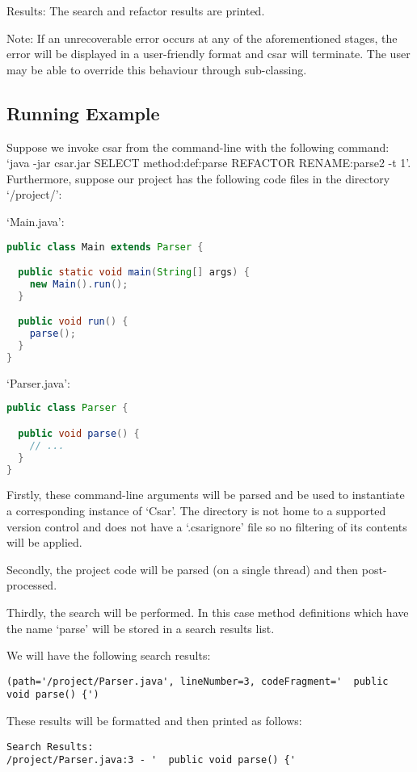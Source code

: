 \documentclass[12pt, letterpaper, oneside]{article}
\begin{document}
Results:\newline
The search and refactor results are printed.

Note: If an unrecoverable error occurs at any of the aforementioned stages, the error will be displayed in a user-friendly format and csar will terminate.
The user may be able to override this behaviour through sub-classing.

\subsection{Running Example}
Suppose we invoke csar from the command-line with the following command: `java -jar csar.jar SELECT method:def:parse REFACTOR RENAME:parse2 -t 1'.
Furthermore, suppose our project has the following code files in the directory `/project/':

`Main.java':
\begin{lstlisting}[language=Java]
public class Main extends Parser {

  public static void main(String[] args) {
    new Main().run();
  }

  public void run() {
    parse();
  }
}
\end{lstlisting}

`Parser.java':
\begin{lstlisting}[language=Java]
public class Parser {

  public void parse() {
    // ...
  }
}
\end{lstlisting}

Firstly, these command-line arguments will be parsed and be used to instantiate a corresponding instance of `Csar'. The directory is not home to a supported version control and does not have a `.csarignore' file so no filtering of its contents will be applied.

Secondly, the project code will be parsed (on a single thread) and then post-processed.

Thirdly, the search will be performed. In this case method definitions which have the name `parse' will be stored in a search results list.

We will have the following search results:
\begin{lstlisting}
(path='/project/Parser.java', lineNumber=3, codeFragment='  public void parse() {')
\end{lstlisting}

These results will be formatted and then printed as follows:
\begin{lstlisting}
Search Results:
/project/Parser.java:3 - '  public void parse() {'
\end{lstlisting}
\end{document}
